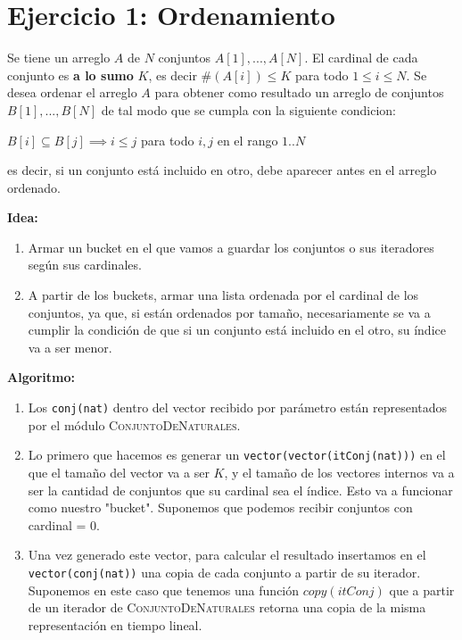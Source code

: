 \documentclass[10pt, a4paper]{article}
\begin{document}
\thispagestyle{empty}


\setcounter{page}{1}

\section*{Ejercicio 1: Ordenamiento}
Se tiene un arreglo $A$ de $N$ conjuntos $A[1],...,A[N]$. El cardinal de cada conjunto es \textbf{a lo sumo} $K$, es decir \#$(A[i])\leq K$ para todo $1 \leq i \leq N$. Se desea ordenar el arreglo $A$ para obtener como resultado un arreglo de conjuntos $B[1],...,B[N]$ de tal modo que se cumpla con la siguiente condicion:
\begin{center}
$B[i] \subseteq B[j] \implies i \leq j$ \tab para todo $i,j$ en el rango $1..N$
\end{center}
es decir, si un conjunto est\'a incluido en otro, debe aparecer antes en el arreglo ordenado.

\vspace{0.5em}

\textbf{Idea: }
\begin{enumerate}
  \item Armar un bucket en el que vamos a guardar los conjuntos o sus iteradores seg\'un sus cardinales.
  \item A partir de los buckets, armar una lista ordenada por el cardinal de los conjuntos, ya que, si est\'an ordenados por tama\~no, necesariamente se va a cumplir la condici\'on de que si un conjunto est\'a incluido en el otro, su \'indice va a ser menor.
\end{enumerate}

\textbf{Algoritmo: }
\begin{enumerate}
  \item Los \texttt{conj(nat)} dentro del vector recibido por par\'ametro est\'an representados por el m\'odulo \textsc{ConjuntoDeNaturales}.
  \item Lo primero que hacemos es generar un \texttt{vector(vector(itConj(nat)))} en el que el tama\~no del vector va a ser $K$, y el tama\~no de los vectores internos va a ser la cantidad de conjuntos que su cardinal sea el \'indice. Esto va a funcionar como nuestro "bucket". Suponemos que podemos recibir conjuntos con cardinal = 0.
  \item Una vez generado este vector, para calcular el resultado insertamos en el \texttt{vector(conj(nat))} una copia de cada conjunto a partir de su iterador. Suponemos en este caso que tenemos una funci\'on $copy(itConj)$ que a partir de un iterador de \textsc{ConjuntoDeNaturales} retorna una copia de la misma representaci\'on en tiempo lineal.
\end{enumerate}
\end{document}
